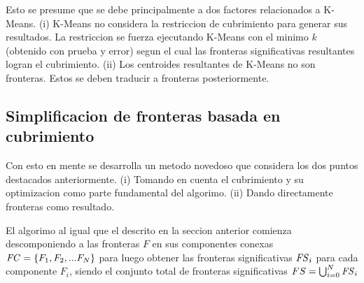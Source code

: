 


Esto se presume que se debe principalmente a dos factores relacionados a
K-Means. (i) K-Means no considera la restriccion de cubrimiento para generar sus
resultados. La restriccion se fuerza ejecutando K-Means con el minimo $k$
(obtenido con prueba y error) segun el cual las fronteras significativas
resultantes logran el cubrimiento. (ii) Los centroides resultantes de K-Means
no son fronteras. Estos se deben traducir a fronteras posteriormente.




\subsection{Simplificacion de fronteras basada en cubrimiento}\label{subsec:MiSimp}
Con esto en mente se desarrolla un metodo novedoso que considera los dos puntos
destacados anteriormente. (i) Tomando en cuenta el cubrimiento y su
optimizacion como parte fundamental del algorimo. (ii) Dando directamente
fronteras como resultado.

El algorimo al igual que el descrito en la seccion anterior comienza
descomponiendo a las fronteras $F$ en sus componentes conexas
$\mathit{FC}=\{F_1,F_2,...F_N\}$ para luego obtener las fronteras significativas
$\mathit{FS}_i$ para cada componente $F_i$, siendo el conjunto total de fronteras
significativas $FS = \bigcup^N_{i=0} \mathit{FS}_i$

